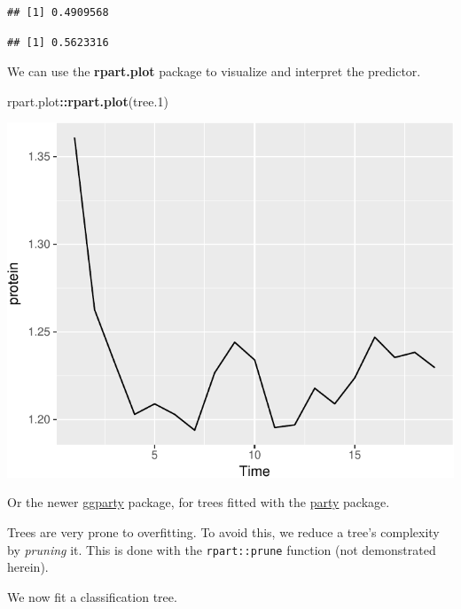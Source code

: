 \documentclass[]{book}
\newenvironment{Shaded}{\begin{snugshade}}{\end{snugshade}}
\newcommand{\KeywordTok}[1]{\textcolor[rgb]{0.13,0.29,0.53}{\textbf{#1}}}
\newcommand{\DataTypeTok}[1]{\textcolor[rgb]{0.13,0.29,0.53}{#1}}
\newcommand{\DecValTok}[1]{\textcolor[rgb]{0.00,0.00,0.81}{#1}}
\newcommand{\StringTok}[1]{\textcolor[rgb]{0.31,0.60,0.02}{#1}}
\newcommand{\CommentTok}[1]{\textcolor[rgb]{0.56,0.35,0.01}{\textit{#1}}}
\newcommand{\OperatorTok}[1]{\textcolor[rgb]{0.81,0.36,0.00}{\textbf{#1}}}
\newcommand{\NormalTok}[1]{#1}
\theoremstyle{definition}
\theoremstyle{definition}
\theoremstyle{definition}
\theoremstyle{remark}
\begin{document}
\begin{verbatim}
## [1] 0.4909568
\end{verbatim}

\begin{Shaded}
\end{Shaded}

\begin{verbatim}
## [1] 0.5623316
\end{verbatim}

We can use the \textbf{rpart.plot} package to visualize and interpret
the predictor.

\begin{Shaded}
\begin{Highlighting}[]
\NormalTok{rpart.plot}\OperatorTok{::}\KeywordTok{rpart.plot}\NormalTok{(tree.}\DecValTok{1}\NormalTok{)}
\end{Highlighting}
\end{Shaded}

\includegraphics[width=0.5\linewidth]{Rcourse_files/figure-latex/unnamed-chunk-244-1}

Or the newer
\href{https://cran.r-project.org/web/packages/ggparty/vignettes/ggparty-graphic-partying.html}{ggparty}
package, for trees fitted with the
\href{https://cran.r-project.org/package=party}{party} package.

Trees are very prone to overfitting. To avoid this, we reduce a tree's
complexity by \emph{pruning} it. This is done with the
\texttt{rpart::prune} function (not demonstrated herein).

We now fit a classification tree.
\end{document}
